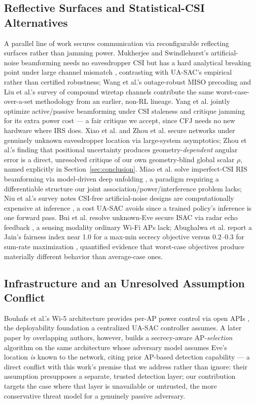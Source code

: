 \documentclass[conference]{IEEEtran}
\begin{document}
\subsection{Reflective Surfaces and Statistical-CSI Alternatives}

A parallel line of work secures communication via reconfigurable reflecting surfaces rather than jamming power. Mukherjee and Swindlehurst's artificial-noise beamforming needs no eavesdropper CSI but has a hard analytical breaking point under large channel mismatch \cite{mukherjee}, contrasting with UA-SAC's empirical rather than certified robustness; Wang et al.'s outage-robust MISO precoding \cite{wang} and Liu et al.'s survey of compound wiretap channels \cite{liu} contribute the same worst-case-over-a-set methodology from an earlier, non-RL lineage. Yang et al. jointly optimize active/passive beamforming under CSI staleness and critique jamming for its extra power cost \cite{yang} --- a fair critique we accept, since CFJ needs no new hardware where IRS does. Xiao et al. \cite{starris} and Zhou et al. \cite{zhou26} secure networks under genuinely unknown eavesdropper location via large-system asymptotics; Zhou et al.'s finding that positional uncertainty produces geometry-\emph{dependent} angular error is a direct, unresolved critique of our own geometry-blind global scalar $\rho$, named explicitly in Section~\ref{sec:conclusion}. Miao et al. solve imperfect-CSI RIS beamforming via model-driven deep unfolding \cite{miao26}, a paradigm requiring a differentiable structure our joint association/power/interference problem lacks; Niu et al.'s survey notes CSI-free artificial-noise designs are computationally expensive at inference \cite{ansurvey}, a cost UA-SAC avoids since a trained policy's inference is one forward pass. Bui et al. resolve unknown-Eve secure ISAC via radar echo feedback \cite{bui26}, a sensing modality ordinary Wi-Fi APs lack; Abughalwa et al. report a Jain's fairness index near 1.0 for a max-min secrecy objective versus 0.2--0.3 for sum-rate maximization \cite{abughalwa25}, quantified evidence that worst-case objectives produce materially different behavior than average-case ones.

\subsection{Infrastructure and an Unresolved Assumption Conflict}

Bouhafs et al.'s Wi-5 architecture provides per-AP power control via open APIs \cite{wifi5}, the deployability foundation a centralized UA-SAC controller assumes. A later paper by overlapping authors, however, builds a secrecy-aware AP-\emph{selection} algorithm on the same architecture whose adversary model assumes Eve's location \emph{is} known to the network, citing prior AP-based detection capability \cite{spectrum} --- a direct conflict with this work's premise that we address rather than ignore: their assumption presupposes a separate, trusted detection layer; our contribution targets the case where that layer is unavailable or untrusted, the more conservative threat model for a genuinely passive adversary.
\end{document}
